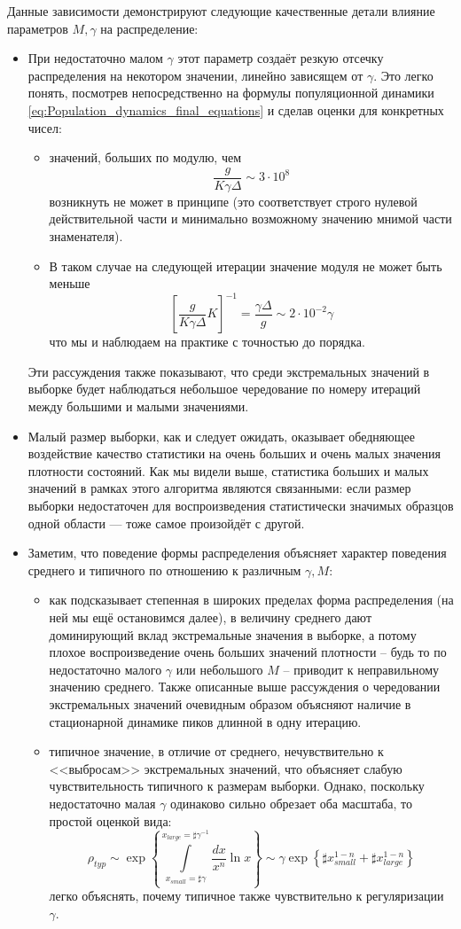 Данные зависимости демонстрируют следующие качественные детали влияние параметров $M, \gamma$ на распределение:
\begin{itemize}
	\item При недостаточно малом $\gamma$ этот параметр создаёт резкую отсечку распределения на некотором значении, линейно зависящем от $\gamma$. Это легко понять, посмотрев непосредственно на формулы популяционной динамики \eqref{eq:Population_dynamics_final_equations} и сделав оценки для конкретных чисел:
	\begin{itemize}
		\item значений, больших по модулю, чем 
		$$\frac{g}{K \gamma \Delta} \sim 3 \cdot 10^{8}$$
		возникнуть не может в принципе (это соответствует строго нулевой действительной части и минимально возможному значению мнимой части знаменателя).
		\item В таком случае на следующей итерации значение модуля не может быть меньше
		$$ \left[ \frac{g}{K \gamma \Delta} K \right]^{-1} = \frac{\gamma \Delta}{g} \sim 2 \cdot 10^{-2} \gamma$$
		что мы и наблюдаем на практике с точностью до порядка.
	\end{itemize}
	Эти рассуждения также показывают, что среди экстремальных значений в выборке будет наблюдаться небольшое чередование по номеру итераций между большими и малыми значениями.
	\item Малый размер выборки, как и следует ожидать, оказывает обедняющее воздействие качество статистики на очень больших и очень малых значения плотности состояний. Как мы видели выше, статистика больших и малых значений в рамках этого алгоритма являются связанными: если размер выборки недостаточен для воспроизведения статистически значимых образцов одной области --- тоже самое произойдёт с другой. 
	\item Заметим, что поведение формы распределения объясняет характер поведения среднего и типичного по отношению к различным $\gamma, M$:
	\begin{itemize}
		\item как подсказывает степенная в широких пределах форма распределения (на ней мы ещё остановимся далее), в величину среднего дают доминирующий вклад экстремальные значения в выборке, а потому плохое воспроизведение очень больших значений плотности -- будь то по недостаточно малого $\gamma$ или небольшого $M$ -- приводит к неправильному значению среднего. Также описанные выше рассуждения о чередовании экстремальных значений очевидным образом объясняют наличие в стационарной динамике пиков длинной в одну итерацию.
		\item типичное значение, в отличие от среднего, нечувствительно к <<выбросам>> экстремальных значений, что объясняет слабую чувствительность типичного к размерам выборки.
		Однако, поскольку недостаточно малая $\gamma$ одинаково сильно обрезает оба масштаба, то простой оценкой вида:
		$$
		\rho_{typ} \sim \exp\left\{ \int \limits_{ x_{small} = \sharp \gamma }^{ x_{large} = \sharp \gamma^{-1} } \frac{dx}{x^n} \ln x \right\} \sim \gamma  \exp \left\{ \sharp x_{small}^{1-n} + \sharp x_{large}^{1-n} \right\}
		$$
		легко объяснять, почему типичное также чувствительно к регуляризации $\gamma$.
	\end{itemize}
\end{itemize}